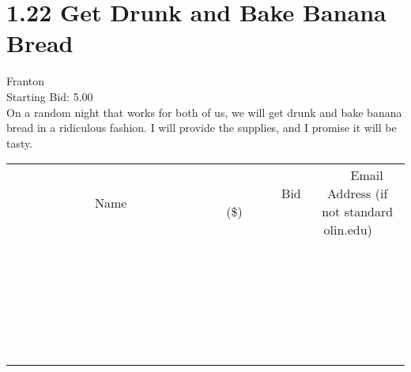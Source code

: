 \documentclass[11pt]{article}
\begin{document}
					\section*{1.22 Get Drunk and Bake Banana Bread}
					Franton \\
					Starting Bid: 5.00 \\
					On a random night that works for both of us, we will get drunk and bake banana bread in a ridiculous fashion. I will provide the supplies, and I promise it will be tasty. \\
					[6ex]
					\begin{tabular}{c c c}
						~~~~~~~~~~~~~Name~~~~~~~~~~~~~ & ~~~~~~~~~Bid (\$)~~~~~~~~~ & ~~~Email Address (if not standard olin.edu)~~~ \\
				
 & & \\
\hline
 & & \\
\hline
 & & \\
\hline
 & & \\
\hline
 & & \\
\hline
 & & \\
\hline
 & & \\
\hline
 & & \\
\hline
 & & \\
\hline
 & & \\
\hline
 & & \\
\hline
 & & \\
\hline
 & & \\
\hline
 & & \\
\hline
 & & \\
\hline
 & & \\
\hline
 & & \\
\hline
 & & \\
\hline
 & & \\
\hline
 & & \\
\hline
 & & \\
\hline
 & & \\
\hline
 & & \\
\hline
 & & \\
\hline
 & & \\
\hline
 & & \\
\hline
					\end{tabular}
					\clearpage
				
\end{document}
